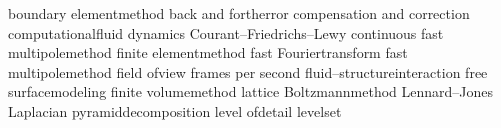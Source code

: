 
   {boundary element}{method}
 {back and forth}{error compensation and correction}
   {computational}{fluid dynamics}
   {Courant--Friedrichs--Lewy} 
  {continuous fast multipole}{method}
 
   {finite element}{method}
   {fast Fourier}{transform}
   {fast multipole}{method}
   {field of}{view}
   {frames per second}
   {fluid--structure}{interaction}
   {free surface}{modeling}
   {finite volume}{method}
   {lattice Boltzmann}{method}
    {Lennard--Jones} 
   {Laplacian pyramid}{decomposition} 
   {level of}{detail}
\def            \LODs   {\mbox{\LOD\nspace s}\xspace}
    {level}{set} 
